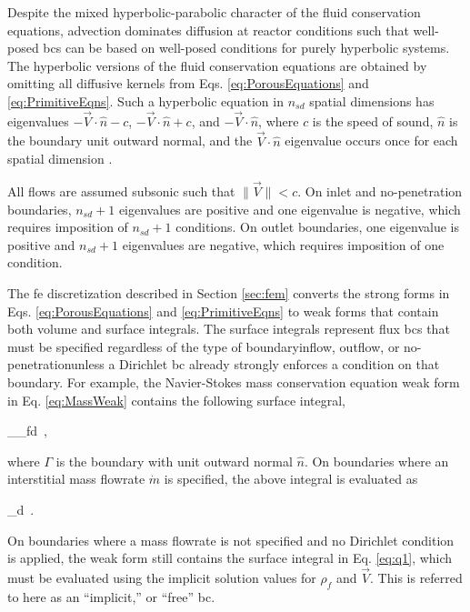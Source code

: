 Despite the mixed hyperbolic-parabolic character of the fluid conservation equations, advection dominates diffusion at reactor conditions such that well-posed \glspl{bc} can be based on well-posed conditions for purely hyperbolic systems. The hyperbolic versions of the fluid conservation equations are obtained by omitting all diffusive kernels from Eqs. \eqref{eq:PorousEquations} and \eqref{eq:PrimitiveEqns}. Such a hyperbolic equation in \(n_{sd}\) spatial dimensions has eigenvalues \(-\vec{V}\cdot\hat{n}-c\), \(-\vec{V}\cdot\hat{n}+c\), and \(-\vec{V}\cdot\hat{n}\), where \(c\) is the speed of sound, \(\hat{n}\) is the boundary unit outward normal, and the \(\vec{V}\cdot\hat{n}\) eigenvalue occurs once for each spatial dimension \cite{rohde}. 

All flows are assumed subsonic such that \(\|\vec{V}\|<c\). On inlet and no-penetration boundaries, \(n_{sd}+1\) eigenvalues are positive and one eigenvalue is negative, which requires imposition of \(n_{sd}+1\) conditions. On outlet boundaries, one eigenvalue is positive and \(n_{sd}+1\) eigenvalues are negative, which requires imposition of one condition.

The \gls{fe} discretization described in Section \ref{sec:fem} converts the strong forms in Eqs. \eqref{eq:PorousEquations} and \eqref{eq:PrimitiveEqns} to weak forms that contain both volume and surface integrals. The surface integrals represent flux \glspl{bc} that must be specified regardless of the type of boundary\mdash inflow, outflow, or no-penetration\mdash unless a Dirichlet \gls{bc} already strongly enforces a condition on that boundary. For example, the Navier-Stokes mass conservation equation weak form in Eq. \eqref{eq:MassWeak} contains the following surface integral,

\beq
\label{eq:q1}
\int_{\Gamma}\epsilon\rho_f\cdot{}d\Gamma\ ,
\eeq

\noindent where \(\Gamma\) is the boundary with unit outward normal \(\hat{n}\). On boundaries where an interstitial mass flowrate \(\dot{m}\) is specified, the above integral is evaluated as

\beq
\int_{\Gamma}\epsilon{}d\Gamma\ .
\eeq

\noindent On boundaries where a mass flowrate is not specified and no Dirichlet condition is applied, the weak form still contains the surface integral in Eq. \eqref{eq:q1}, which must be evaluated using the implicit solution values for \(\rho_f\) and \(\vec{V}\). This is referred to here as an ``implicit,'' or ``free'' \gls{bc}. 

